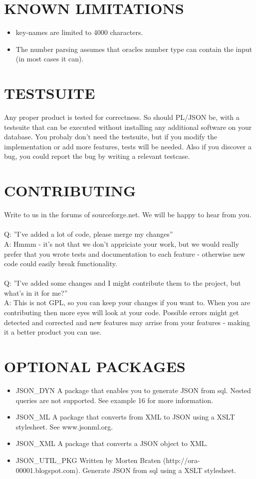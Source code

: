 \documentclass[11pt,a4paper]{article}
\begin{document}
\section{KNOWN LIMITATIONS}
\begin{itemize}
\item key-names are limited to 4000 characters.
\item The number parsing assumes that oracles number type can contain the input (in most cases it can).
\end {itemize}

\section{TESTSUITE}
Any proper product is tested for correctness. So should PL/JSON be, with a testsuite that can be executed without installing any additional software on your database. You probaly don't need the testsuite, but if you modify the implementation or add more features, tests will be needed. Also if you discover a bug, you could report the bug by writing a relevant testcase.

\section{CONTRIBUTING}
Write to us in the forums of sourceforge.net. We will be happy to hear from you. \\\\
Q: ''I've added a lot of code, please merge my changes''\\
A: Hmmm - it's not that we don't appriciate your work, but we would really prefer that you wrote tests and documentation to each feature - otherwise new code could easily break functionality. \\\\
Q: ''I've added some changes and I might contribute them to the project, but what's in it for me?''\\
A: This is not GPL, so you can keep your changes if you want to. 
When you are contributing then more eyes will look at your code. 
Possible errors might get detected and corrected and new features may arrise from your features - making it a better product you can use.

\section{OPTIONAL PACKAGES}
\begin{itemize}
\item JSON\_DYN A package that enables you to generate JSON from sql. Nested queries are not supported. See example 16 for more information.
\item JSON\_ML A package that converts from XML to JSON using a XSLT stylesheet. See www.jsonml.org.
\item JSON\_XML A package that converts a JSON object to XML. 
\item JSON\_UTIL\_PKG Written by Morten Braten (http://ora-00001.blogspot.com). Generate JSON from sql using a XSLT stylesheet. 
\end{itemize}
\end{document}
